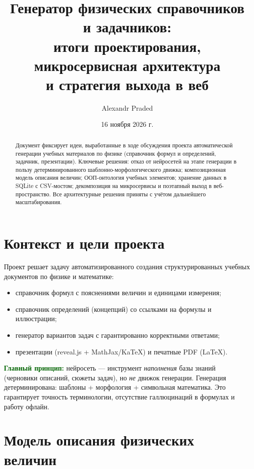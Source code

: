 \documentclass[12pt,a4paper]{article}
\title{\textbf{Генератор физических справочников и задачников:\\
итоги проектирования, микросервисная архитектура\\
и стратегия выхода в веб}}
\author{Alexandr Praded}
\date{16 ноября 2026 г.}
\newcommand{\idea}[1]{\textcolor{darkgreen}{\textbf{#1}}}
\begin{document}
\maketitle
\begin{abstract}
\noindent Документ фиксирует идеи, выработанные в ходе обсуждения проекта автоматической генерации учебных материалов по физике (справочник формул и определений, задачник, презентации). Ключевые решения: отказ от нейросетей на этапе генерации в пользу детерминированного шаблонно-морфологического движка; композиционная модель описания величин; ООП-онтология учебных элементов; хранение данных в SQLite с CSV-мостом; декомпозиция на микросервисы и поэтапный выход в веб-пространство. Все архитектурные решения приняты с учётом дальнейшего масштабирования.
\end{abstract}

\tableofcontents
\newpage

\section{Контекст и цели проекта}

Проект решает задачу автоматизированного создания структурированных учебных документов по физике и математике:
\begin{itemize}
  \item справочник формул с пояснениями величин и единицами измерения;
  \item справочник определений (концепций) со ссылками на формулы и иллюстрации;
  \item генератор вариантов задач с гарантированно корректными ответами;
  \item презентации (reveal.js + MathJax/KaTeX) и печатные PDF (LaTeX).
\end{itemize}

\idea{Главный принцип:} нейросеть --- инструмент \emph{наполнения} базы знаний (черновики описаний, сюжеты задач), но \emph{не} движок генерации. Генерация детерминирована: шаблоны + морфология + символьная математика. Это гарантирует точность терминологии, отсутствие галлюцинаций в формулах и работу офлайн.

\section{Модель описания физических величин}
\end{document}
